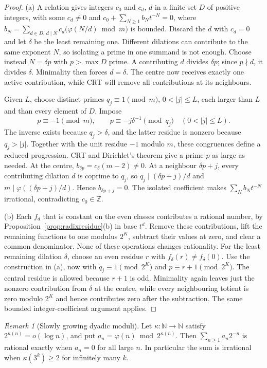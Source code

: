 \documentclass[11pt]{article}
\theoremstyle{plain}
\theoremstyle{definition}
\theoremstyle{remark}
\newtheorem{rem}[thm]{Remark}
\newcommand{\N}{\mathbb{N}}
\newcommand{\Z}{\mathbb{Z}}
\begin{document}
\begin{proof}
(a) A relation gives integers $c_0$ and $c_d$, $d$ in a finite set $D$ of
positive integers, with some $c_d\ne0$ and
$c_0+\sum_{N\ge1}b_Nt^{-N}=0$, where
$b_N=\sum_{d\in D,\,d\mid N}c_d\bigl(\varphi(N/d)\bmod m\bigr)$ is bounded.
Discard the $d$ with $c_d=0$ and let $\delta$ be the least remaining one.
Different dilations can contribute to the same exponent $N$, so
isolating a prime in one summand is not enough. Choose instead
$N=\delta p$ with $p>\max D$ prime. A contributing $d$ divides
$\delta p$; since $p\nmid d$, it divides $\delta$. Minimality then
forces $d=\delta$. The centre now receives exactly one active
contribution, while CRT will remove all contributions at its neighbours.

Given $L$, choose distinct primes $q_j\equiv1\pmod m$, $0<|j|\le L$,
each larger than $L$ and than every element of $D$. Impose
\[
 p\equiv-1\pmod m,\qquad
 p\equiv-j\delta^{-1}\pmod{q_j}\quad(0<|j|\le L).
\]
The inverse exists because $q_j>\delta$, and the latter residue is
nonzero because $q_j>|j|$. Together with the unit residue $-1$
modulo $m$, these congruences define a reduced progression.
CRT and Dirichlet's theorem give a prime $p$ as large as needed.
At the centre, $b_{\delta p}=c_\delta(m-2)\ne0$.
At a neighbour $\delta p+j$, every contributing dilation $d$ is
coprime to $q_j$, so $q_j\mid(\delta p+j)/d$ and
$m\mid\varphi((\delta p+j)/d)$. Hence $b_{\delta p+j}=0$.
The isolated coefficient makes $\sum_Nb_Nt^{-N}$ irrational,
contradicting $c_0\in\Z$.

(b) Each $f_d$ that is constant on the even classes contributes a rational
number, by Proposition~\ref{prop:radixresidue}(b) in base $t^d$.
Remove these contributions, lift the remaining functions to one
modulus $2^K$, subtract their values at zero, and clear a common
denominator. None of these operations changes rationality.
For the least remaining dilation $\delta$, choose an even residue $r$
with $f_\delta(r)\ne f_\delta(0)$. Use the construction in (a), now
with $q_j\equiv1\pmod{2^K}$ and $p\equiv r+1\pmod{2^K}$.
The central residue is allowed because $r+1$ is odd. Minimality
again leaves just the nonzero contribution from $\delta$ at the
centre, while every neighbouring totient is zero modulo $2^K$
and hence contributes zero after the subtraction. The same bounded
integer-coefficient argument applies.
\end{proof}

\begin{rem}[Slowly growing dyadic moduli]
\label{prop:slowmoduli}
Let $\kappa:\N\to\N$ satisfy $2^{\kappa(n)}=o(\log n)$, and put
$a_n=\varphi(n)\bmod2^{\kappa(n)}$. Then $\sum_{n\ge1}a_n2^{-n}$ is
rational exactly when $a_n=0$ for all large $n$. In particular the sum is
irrational when $\kappa(3^k)\ge2$ for infinitely many $k$.
\end{rem}
\end{document}
